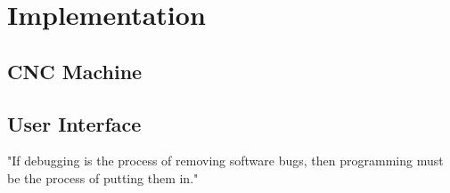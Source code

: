 \chapter{Implementation}
\label{ch:implementation}


\section{CNC Machine}




\section{User Interface}
\begin{savequote}[75mm] 
"If debugging is the process of removing software bugs, then programming must be the process of putting them in."
\end{savequote}



